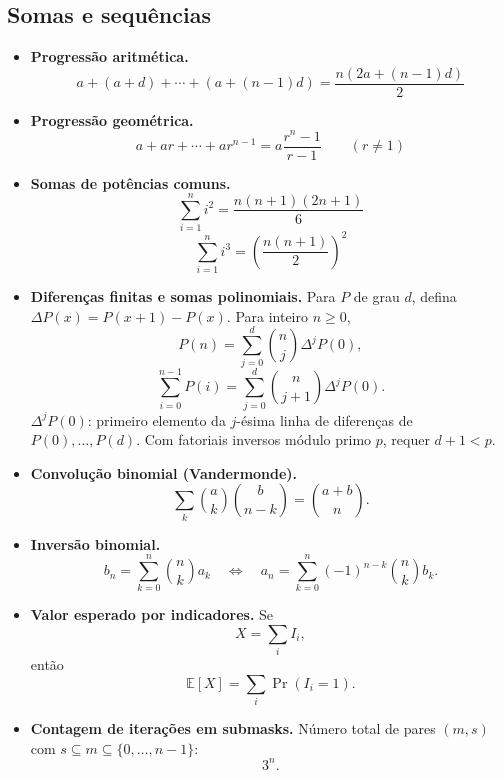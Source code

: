 \subsection{Somas e sequências}
\begin{itemize}[leftmargin=*,label={}]
		\ifextended
	\item \textbf{Progressão aritmética.}
		\[
			a + (a+d) + \cdots + (a+(n-1)d)
			= \frac{n(2a+(n-1)d)}{2}
		\]
		\fi

		\ifextended
	\item \textbf{Progressão geométrica.}
		\[
			a+ar+\cdots+ar^{n-1} = a\frac{r^n-1}{r-1}\qquad (r\ne1)
		\]
		\fi

	\item \textbf{Somas de potências comuns.}
		\[
			\sum_{i=1}^n i^2 = \frac{n(n+1)(2n+1)}{6}
		\]
		\[
			\sum_{i=1}^n i^3 = \left(\frac{n(n+1)}{2}\right)^2
		\]

\item \textbf{Diferenças finitas e somas polinomiais.}
Para $P$ de grau $d$, defina $\Delta P(x)=P(x+1)-P(x)$. Para inteiro $n\ge0$,
\[
P(n)=\sum_{j=0}^{d}\binom nj\Delta^jP(0),
\]
\[
\sum_{i=0}^{n-1}P(i)=\sum_{j=0}^{d}\binom n{j+1}\Delta^jP(0).
\]
$\Delta^jP(0)$: primeiro elemento da $j$-ésima linha de diferenças de $P(0),\ldots,P(d)$. Com fatoriais inversos módulo primo $p$, requer $d+1<p$.

	\item \textbf{Convolução binomial (Vandermonde).}
		\[
			\sum_k \binom{a}{k}\binom{b}{n-k}=\binom{a+b}{n}.
		\]

\item \textbf{Inversão binomial.}
\[
b_n=\sum_{k=0}^{n}\binom nk a_k
\quad\Longleftrightarrow\quad
a_n=\sum_{k=0}^{n}(-1)^{n-k}\binom nk b_k.
\]

		\ifextended
	\item \textbf{Valor esperado por indicadores.}
		Se
		\[
			X=\sum_i I_i,
		\]
		então
		\[
			\mathbb{E}[X]=\sum_i \Pr(I_i=1).
		\]
		\fi

		\ifextended
	\item \textbf{Contagem de iterações em submasks.}
		Número total de pares $(m,s)$ com $s\subseteq m\subseteq \{0,\dots,n-1\}$:
		\[
			3^n.
		\]
		\fi


\end{itemize}
